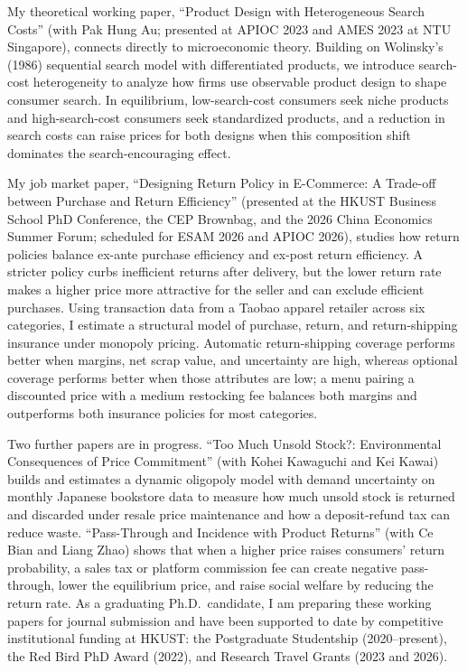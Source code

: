 \documentclass[11pt]{article}
\begin{document}
My theoretical working paper, ``Product Design with Heterogeneous Search Costs'' (with Pak Hung Au; presented at APIOC 2023 and AMES 2023 at NTU Singapore), connects directly to microeconomic theory. Building on Wolinsky's (1986) sequential search model with differentiated products, we introduce search-cost heterogeneity to analyze how firms use observable product design to shape consumer search. In equilibrium, low-search-cost consumers seek niche products and high-search-cost consumers seek standardized products, and a reduction in search costs can raise prices for both designs when this composition shift dominates the search-encouraging effect.

My job market paper, ``Designing Return Policy in E-Commerce: A Trade-off between Purchase and Return Efficiency'' (presented at the HKUST Business School PhD Conference, the CEP Brownbag, and the 2026 China Economics Summer Forum; scheduled for ESAM 2026 and APIOC 2026), studies how return policies balance ex-ante purchase efficiency and ex-post return efficiency. A stricter policy curbs inefficient returns after delivery, but the lower return rate makes a higher price more attractive for the seller and can exclude efficient purchases. Using transaction data from a Taobao apparel retailer across six categories, I estimate a structural model of purchase, return, and return-shipping insurance under monopoly pricing. Automatic return-shipping coverage performs better when margins, net scrap value, and uncertainty are high, whereas optional coverage performs better when those attributes are low; a menu pairing a discounted price with a medium restocking fee balances both margins and outperforms both insurance policies for most categories.

Two further papers are in progress. ``Too Much Unsold Stock?: Environmental Consequences of Price Commitment'' (with Kohei Kawaguchi and Kei Kawai) builds and estimates a dynamic oligopoly model with demand uncertainty on monthly Japanese bookstore data to measure how much unsold stock is returned and discarded under resale price maintenance and how a deposit-refund tax can reduce waste. ``Pass-Through and Incidence with Product Returns'' (with Ce Bian and Liang Zhao) shows that when a higher price raises consumers' return probability, a sales tax or platform commission fee can create negative pass-through, lower the equilibrium price, and raise social welfare by reducing the return rate. As a graduating Ph.D.\ candidate, I am preparing these working papers for journal submission and have been supported to date by competitive institutional funding at HKUST: the Postgraduate Studentship (2020--present), the Red Bird PhD Award (2022), and Research Travel Grants (2023 and 2026).
\end{document}

